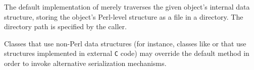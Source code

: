 The default implementation of  merely traverses
the given object's internal data structure, storing the object's
Perl-level structure as a file in a directory.  The directory path is
specified by the caller.

Classes that use non-Perl data structures (for instance, classes like
 or  that use
structures implemented in external \texttt{C} code) may override the
default  method in order to invoke alternative
serialization mechanisms.
